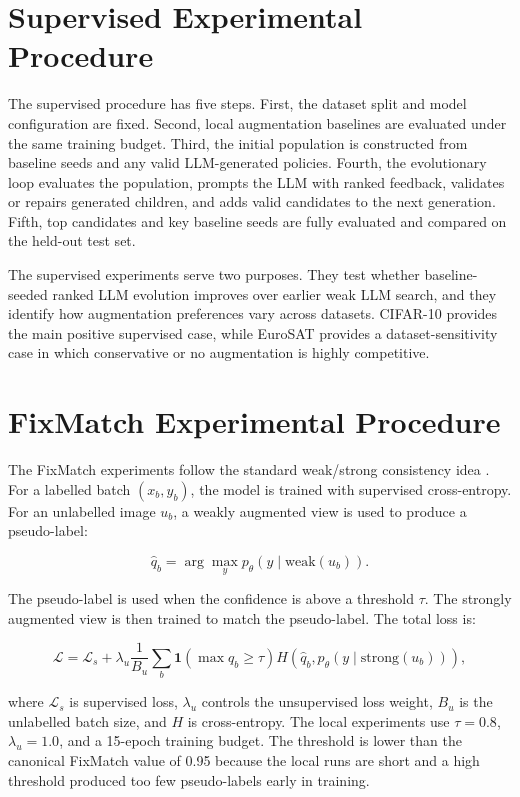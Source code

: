 \documentclass[12pt,a4paper]{report}
\begin{document}
\section{Supervised Experimental Procedure}

The supervised procedure has five steps. First, the dataset split and model configuration are fixed. Second, local augmentation baselines are evaluated under the same training budget. Third, the initial population is constructed from baseline seeds and any valid LLM-generated policies. Fourth, the evolutionary loop evaluates the population, prompts the LLM with ranked feedback, validates or repairs generated children, and adds valid candidates to the next generation. Fifth, top candidates and key baseline seeds are fully evaluated and compared on the held-out test set.

The supervised experiments serve two purposes. They test whether baseline-seeded ranked LLM evolution improves over earlier weak LLM search, and they identify how augmentation preferences vary across datasets. CIFAR-10 provides the main positive supervised case, while EuroSAT provides a dataset-sensitivity case in which conservative or no augmentation is highly competitive.

\section{FixMatch Experimental Procedure}

The FixMatch experiments follow the standard weak/strong consistency idea \citep{sohn2020fixmatch}. For a labelled batch $(x_b, y_b)$, the model is trained with supervised cross-entropy. For an unlabelled image $u_b$, a weakly augmented view is used to produce a pseudo-label:

\begin{equation}
\hat{q}_b = \arg\max_y p_\theta(y \mid \mathrm{weak}(u_b)).
\end{equation}

The pseudo-label is used when the confidence is above a threshold $\tau$. The strongly augmented view is then trained to match the pseudo-label. The total loss is:

\begin{equation}
\mathcal{L} = \mathcal{L}_s + \lambda_u \frac{1}{B_u}\sum_b \mathbf{1}(\max q_b \geq \tau)
H(\hat{q}_b, p_\theta(y \mid \mathrm{strong}(u_b))),
\end{equation}

where $\mathcal{L}_s$ is supervised loss, $\lambda_u$ controls the unsupervised loss weight, $B_u$ is the unlabelled batch size, and $H$ is cross-entropy. The local experiments use $\tau = 0.8$, $\lambda_u = 1.0$, and a 15-epoch training budget. The threshold is lower than the canonical FixMatch value of 0.95 because the local runs are short and a high threshold produced too few pseudo-labels early in training.
\end{document}

